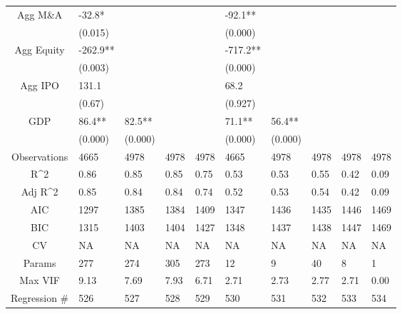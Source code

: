 \documentclass{article}
\begin{document}
\begin{table}[H]
\begin{tabular}{|clllllllll|}
  Agg M\&A & -32.8* &  &  &  & -92.1** &  &  &  &  \\ 
   & (0.015) &  &  &  & (0.000) &  &  &  &  \\ 
  Agg Equity & -262.9** &  &  &  & -717.2** &  &  &  &  \\ 
   & (0.003) &  &  &  & (0.000) &  &  &  &  \\ 
  Agg IPO & 131.1 &  &  &  & 68.2 &  &  &  &  \\ 
   & (0.67) &  &  &  & (0.927) &  &  &  &  \\ 
  GDP & 86.4** & 82.5** &  &  & 71.1** & 56.4** &  &  &  \\ 
   & (0.000) & (0.000) &  &  & (0.000) & (0.000) &  &  &  \\ 
  \hline 
 Observations & 4665 & 4978 & 4978 & 4978 & 4665 & 4978 & 4978 & 4978 & 4978 \\ 
  R^2 & 0.86 & 0.85 & 0.85 & 0.75 & 0.53 & 0.53 & 0.55 & 0.42 & 0.09 \\ 
  Adj R^2 & 0.85 & 0.84 & 0.84 & 0.74 & 0.52 & 0.53 & 0.54 & 0.42 & 0.09 \\ 
  AIC & 1297 & 1385 & 1384 & 1409 & 1347 & 1436 & 1435 & 1446 & 1469 \\ 
  BIC & 1315 & 1403 & 1404 & 1427 & 1348 & 1437 & 1438 & 1447 & 1469 \\ 
  CV & NA & NA & NA & NA & NA & NA & NA & NA & NA \\ 
  Params & 277 & 274 & 305 & 273 & 12 & 9 & 40 & 8 & 1 \\ 
  Max VIF & 9.13 & 7.69 & 7.93 & 6.71 & 2.71 & 2.73 & 2.77 & 2.71 & 0.00 \\ 
  Regression \# & 526 & 527 & 528 & 529 & 530 & 531 & 532 & 533 & 534 \\ 
   \hline
\end{tabular}
 
\end{table}
\end{document}
